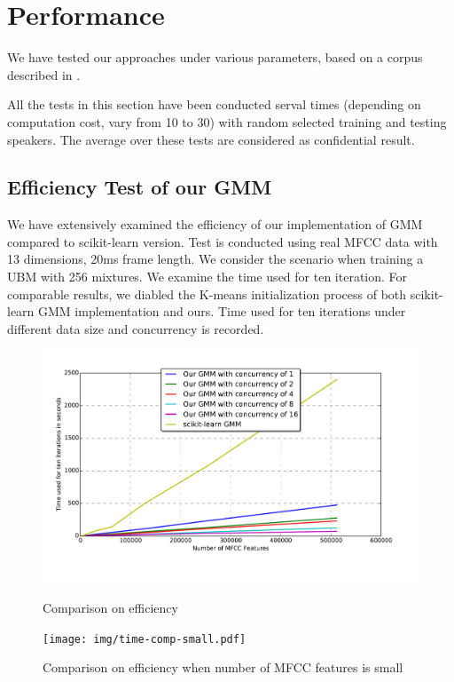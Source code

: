 \section{Performance}
\label{sec:result}
We have tested our approaches under various parameters, based on a corpus described in .

All the tests in this section have been conducted serval times
(depending on computation cost, vary from 10 to 30)
with random selected training and testing speakers.
The average over these tests are considered as confidential result.

\subsection{Efficiency Test of our GMM}
We have extensively examined the efficiency of our implementation of GMM
compared to scikit-learn version. Test is conducted using real MFCC data with
13 dimensions, 20ms frame length. We consider the scenario when training a UBM with 256 mixtures.
We examine the time used for ten iteration.  For comparable results, we diabled
the K-means initialization process of both scikit-learn GMM implementation and
ours. Time used for ten iterations under different data size and concurrency
is recorded.

\begin{figure}[!ht]
	\begin{minipage}{0.48\linewidth}
		\centering
		\includegraphics[width=\linewidth]{img/time-comp.pdf}
		\caption{Comparison on efficiency\label{fig:gmm_efficiency}}
	\end{minipage}
	\hfill
	\begin{minipage}{0.48\linewidth}
		\centering
		\texttt{[image: img/time-comp-small.pdf]}
		\caption{Comparison on efficiency when number of MFCC features is small\label{fig:gmm_efficiency_small}}
	\end{minipage}
\end{figure}

